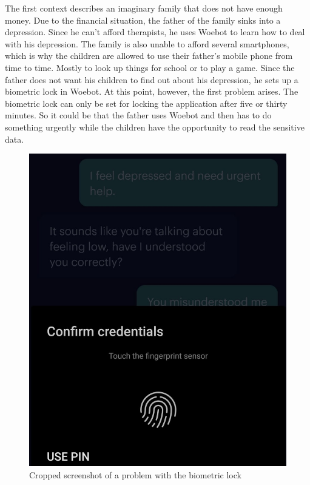 The first context describes an imaginary family that does not have enough money.
Due to the financial situation, the father of the family sinks into a depression.
Since he can't afford therapists, he uses Woebot to learn how to deal with his depression.
The family is also unable to afford several smartphones, which is why the children are allowed to use their father's mobile phone from time to time.
Mostly to look up things for school or to play a game.
Since the father does not want his children to find out about his depression, he sets up a biometric lock in Woebot.
At this point, however, the first problem arises.
The biometric lock can only be set for locking the application after five or thirty minutes.
So it could be that the father uses Woebot and then has to do something urgently while the children have the opportunity to read the sensitive data.\\

\begin{figure}[ht]
    \begin{center}
        \includegraphics[width=1\columnwidth]{files/biometric-lock.png}
        \caption{\label{fig:biometric-lock} Cropped screenshot of a problem with the biometric lock}
    \end{center}
\end{figure}

